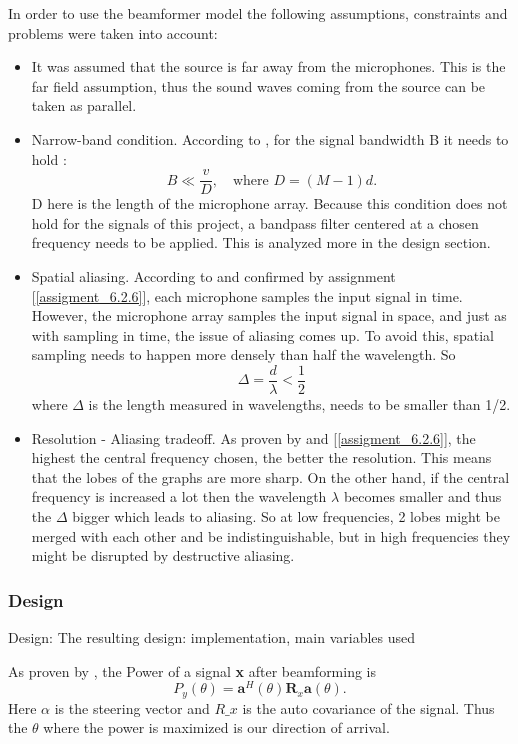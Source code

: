 In order to use the beamformer model the following assumptions, constraints and problems were taken into account:
\begin{itemize}
    \item It was assumed that the source is far away from the microphones. This is the far field assumption, thus the sound waves coming from the source can be taken as parallel.
    
    \item Narrow-band condition. According to \cite{IP3Man}, for the signal bandwidth B it needs to hold : \[
    B \ll \frac{v}{D}, \quad \text{where } D = (M-1)d.
    \] D here is the length of the microphone array. Because this condition does not hold for the signals of this project, a bandpass filter centered at a chosen frequency needs to be applied. This is analyzed more in the design section.
    
    \item Spatial aliasing. According to \cite{IP3Man} and confirmed by assignment [\ref{assigment_6.2.6}], each microphone samples the input signal in time. However, the microphone array samples the input
    signal in space, and just as with sampling in time, the issue of aliasing comes up. To avoid this, spatial sampling needs to happen more densely than half the wavelength. So \[
    \Delta = \frac{d}{\lambda} < \frac{1}{2}
    \] 
    where $\Delta$ is the length measured in wavelengths, needs to be smaller than 1/2.\label{aliasing}

    \item Resolution - Aliasing tradeoff. As proven by \cite{IP3Man} and [\ref{assigment_6.2.6}], the highest the central frequency chosen, the better the resolution. This means that the lobes of the graphs are more sharp. On the other hand, if the central frequency is increased a lot then the wavelength $\lambda$ becomes smaller and thus the $\Delta$ bigger which leads to aliasing. So at low frequencies, 2 lobes might be merged with each other and be indistinguishable, but in high frequencies they might be disrupted by destructive aliasing.   

\end{itemize}


\subsubsection{Design}
Design: 
The resulting design: implementation, main variables used

As proven by \cite{IP3Man}, the Power of a signal \textbf{x} after beamforming is \[
P_y(\theta) = \mathbf{a}^H(\theta) \mathbf{R}_x \mathbf{a}(\theta)
.\]
Here $\alpha$ is the steering vector and $R\_x$ is the auto covariance of the signal.
Thus the $\theta$ where the power is maximized is our direction of arrival.

